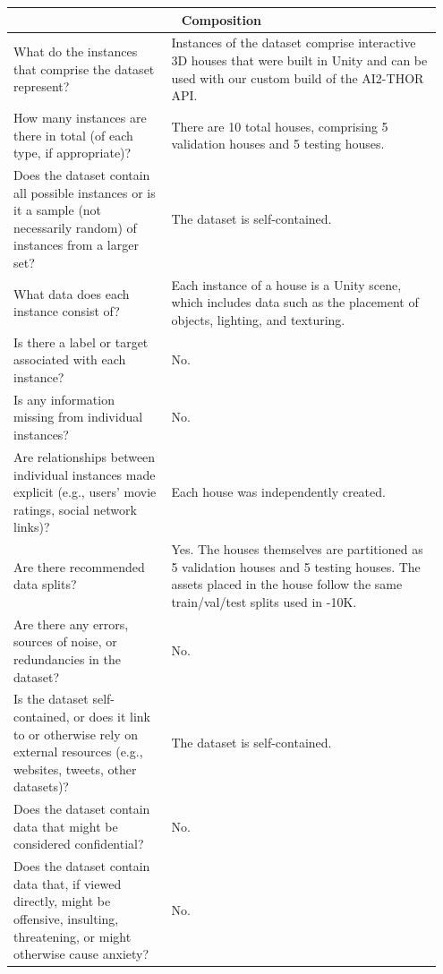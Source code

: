 \begin{longtable}{p{0.35\linewidth} |p{0.6\linewidth} }
    \bottomrule
        \multicolumn{2}{c}{\rule{0in}{0.2in}\textbf{Composition}\vspace{0.10in}}\\
    \toprule
    What do the instances that comprise the dataset represent? & Instances of the dataset comprise interactive 3D houses that were built in Unity and can be used with our custom build of the AI2-THOR API.
    \\[0.15in]
    \midrule
    How many instances are there in total (of each type, if appropriate)? & There are 10 total houses, comprising 5 validation houses and 5 testing houses.\\[0.15in]
    \midrule
    Does the dataset contain all possible instances or is it a sample (not necessarily random) of instances from a larger set? & The dataset is self-contained.\\[0.15in]
    \midrule
    What data does each instance consist of? & Each instance of a house is a Unity scene, which includes data such as the placement of objects, lighting, and texturing.\\[0.15in]
    \midrule
    Is there a label or target associated with each instance? & No.\\[0.15in]
    \midrule
    Is any information missing from individual instances? & No.\\[0.15in]
    \midrule
    Are relationships between individual instances made explicit (e.g., users' movie ratings, social network links)? & Each house was independently created.\\[0.15in]
    \midrule
    Are there recommended data splits? & Yes. The houses themselves are partitioned as 5 validation houses and 5 testing houses. The assets placed in the house follow the same train/val/test splits used in \env{}-10K.\\[0.15in]
    \midrule
    Are there any errors, sources of noise, or redundancies in the dataset? & No.\\[0.15in]
    \midrule
    Is the dataset self-contained, or does it link to or otherwise rely on external resources (e.g., websites, tweets, other datasets)? & The dataset is self-contained.\\[0.15in]
    \midrule
    Does the dataset contain data that might be considered confidential? & No.\\[0.15in]
    \midrule
    Does the dataset contain data that, if viewed directly, might be offensive, insulting, threatening, or might otherwise cause anxiety? & No.\\

\end{longtable}
